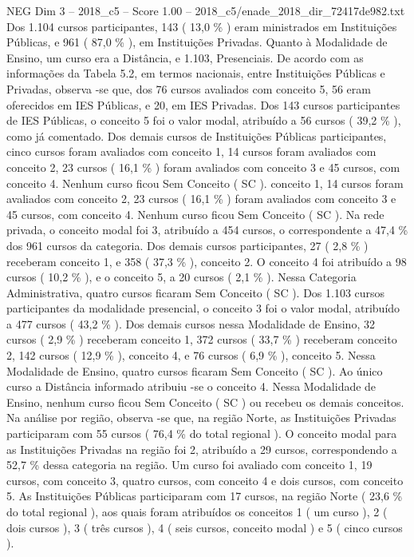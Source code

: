 \begin{textsample}{NEG Dim 3 – 2018\_c5 – Score 1.00 – 2018\_c5/enade\_2018\_dir\_72417de982.txt}
Dos 1.104 cursos participantes, 143 ( 13,0 \% ) eram ministrados em Instituições Públicas, e 961 ( 87,0 \% ), em Instituições Privadas.
Quanto à Modalidade de Ensino, um curso era a Distância, e 1.103, Presenciais.
De acordo com as informações da Tabela 5.2, em termos nacionais, entre Instituições Públicas e Privadas, observa -se que, dos 76 cursos avaliados com conceito 5, 56 eram oferecidos em IES Públicas, e 20, em IES Privadas.
Dos 143 cursos participantes de IES Públicas, o conceito 5 foi o valor modal, atribuído a 56 cursos ( 39,2 \% ), como já comentado.
Dos demais cursos de Instituições Públicas participantes, cinco cursos foram avaliados com conceito 1, 14 cursos foram avaliados com conceito 2, 23 cursos ( 16,1 \% ) foram avaliados com conceito 3 e 45 cursos, com conceito 4.
Nenhum curso ficou Sem Conceito ( SC ). conceito 1, 14 cursos foram avaliados com conceito 2, 23 cursos ( 16,1 \% ) foram avaliados com conceito 3 e 45 cursos, com conceito 4.
Nenhum curso ficou Sem Conceito ( SC ).
Na rede privada, o conceito modal foi 3, atribuído a 454 cursos, o correspondente a 47,4 \% dos 961 cursos da categoria.
Dos demais cursos participantes, 27 ( 2,8 \% ) receberam conceito 1, e 358 ( 37,3 \% ), conceito 2.
O conceito 4 foi atribuído a 98 cursos ( 10,2 \% ), e o conceito 5, a 20 cursos ( 2,1 \% ).
Nessa Categoria Administrativa, quatro cursos ficaram Sem Conceito ( SC ).
Dos 1.103 cursos participantes da modalidade presencial, o conceito 3 foi o valor modal, atribuído a 477 cursos ( 43,2 \% ).
Dos demais cursos nessa Modalidade de Ensino, 32 cursos ( 2,9 \% ) receberam conceito 1, 372 cursos ( 33,7 \% ) receberam conceito 2, 142 cursos ( 12,9 \% ), conceito 4, e 76 cursos ( 6,9 \% ), conceito 5.
Nessa Modalidade de Ensino, quatro cursos ficaram Sem Conceito ( SC ).
Ao único curso a Distância informado atribuiu -se o conceito 4.
Nessa Modalidade de Ensino, nenhum curso ficou Sem Conceito ( SC ) ou recebeu os demais conceitos.
Na análise por região, observa -se que, na região Norte, as Instituições Privadas participaram com 55 cursos ( 76,4 \% do total regional ).
O conceito modal para as Instituições Privadas na região foi 2, atribuído a 29 cursos, correspondendo a 52,7 \% dessa categoria na região.
Um curso foi avaliado com conceito 1, 19 cursos, com conceito 3, quatro cursos, com conceito 4 e dois cursos, com conceito 5.
As Instituições Públicas participaram com 17 cursos, na região Norte ( 23,6 \% do total regional ), aos quais foram atribuídos os conceitos 1 ( um curso ), 2 ( dois cursos ), 3 ( três cursos ), 4 ( seis cursos, conceito modal ) e 5 ( cinco cursos ).

\end{textsample}
